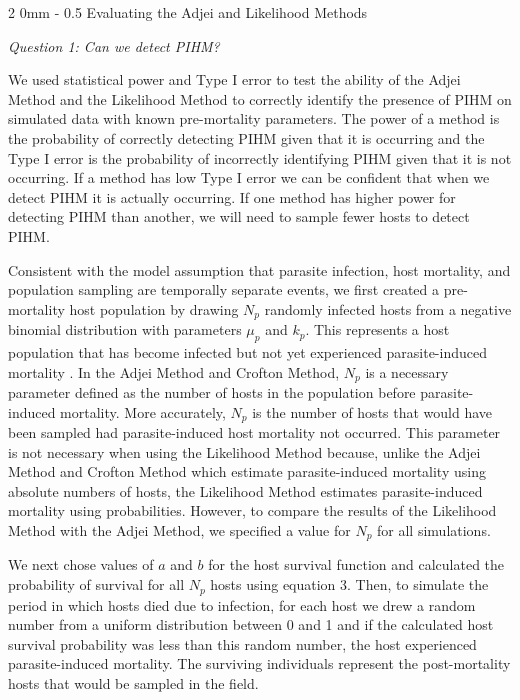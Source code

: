 \documentclass[12pt, a4paper]{article}
\makeatletter
\renewcommand{\subsection}{\@startsection
{subsection}%
{2}%
{0mm}%
{-\baselineskip}%
{0.5\baselineskip}%
{\normalfont\bf}} %
\makeatother
\begin{document}
\subsection{Evaluating the Adjei and Likelihood Methods}

\noindent
\emph{Question 1: Can we detect PIHM?}

We used statistical power and Type I error to test the ability of the Adjei Method and the Likelihood Method to correctly identify the presence of PIHM on simulated data with known pre-mortality parameters. The power of a method is the probability of correctly detecting PIHM given that it is occurring and the Type I error is the probability of incorrectly identifying PIHM given that it is not occurring. If a method has low Type I error we can be confident that when we detect PIHM it is actually occurring.  If one method has higher power for detecting PIHM than another, we will need to sample fewer hosts to detect PIHM.

Consistent with the model assumption that parasite infection, host mortality, and population sampling are temporally separate events, we first created a pre-mortality host population by drawing $N_p$ randomly infected hosts from a
negative binomial distribution with parameters $\mu_p$ and $k_p$. This represents a host population that has become infected but not yet experienced parasite-induced mortality \citep{Adjei1986}.  In the Adjei Method and Crofton Method, $N_p$ is a necessary parameter defined as the number of hosts in the population before parasite-induced mortality. More accurately, $N_p$  is the number of hosts that would have been sampled had parasite-induced host mortality not occurred.  This parameter is not necessary when using the Likelihood Method because, unlike the Adjei Method and Crofton Method which estimate parasite-induced mortality using absolute numbers of hosts, the Likelihood Method estimates parasite-induced mortality using probabilities. However, to compare the results of the Likelihood Method with the Adjei Method, we specified a value for $N_p$ for all simulations.

We next chose values of $a$ and $b$ for the host survival function and calculated the probability of survival
for all $N_p$ hosts using equation 3.  Then, to simulate the period in which hosts died due to infection, for each host we drew a random number from a uniform distribution
between 0 and 1 and if the calculated host survival probability was less than this random
number, the host experienced parasite-induced mortality.  The surviving individuals represent the post-mortality hosts that would be sampled in the field.
\end{document}

